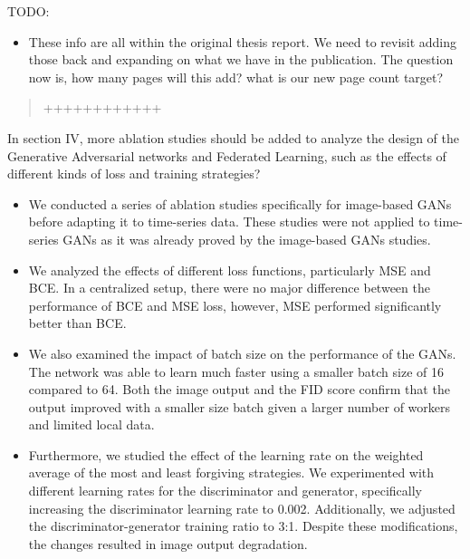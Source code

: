 \documentclass{article}
\begin{document}
\AR TODO: 
\begin{itemize}
    \item These info are all within the original thesis report. We need to revisit adding those back and expanding on what we have in the publication. The question now is, how many pages will this add? what is our new page count target?
\end{itemize}

\begin{quote}
	++++++++++++
\end{quote}

\RC In section IV, more ablation studies should be added to analyze the design of the Generative Adversarial networks and Federated Learning, such as the effects of different kinds of loss and training strategies?

\AR \begin{itemize}
\item We conducted a series of ablation studies specifically for image-based GANs before adapting it to time-series data. These studies were not applied to time-series GANs as it was already proved by the image-based GANs studies.
\item We analyzed the effects of different loss functions, particularly MSE and BCE. In a centralized setup, there were no major difference between the performance of BCE and MSE loss, however, MSE performed significantly better than BCE. 
\item We also examined the impact of batch size on the performance of the GANs. The network was able to learn much faster using a smaller batch size
of 16 compared to 64. Both the image output and the FID score confirm that the output improved with a
smaller size batch given a larger number of workers and limited local data.
\item Furthermore, we studied the effect of the learning rate on the weighted average of the most and least forgiving strategies. We experimented with different learning rates for the discriminator and generator, specifically increasing the discriminator learning rate to 0.002. Additionally, we adjusted the discriminator-generator training ratio to 3:1. Despite these modifications, the changes resulted in image output degradation.
\end{itemize}
%
\end{document}
